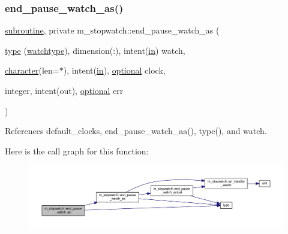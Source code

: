 \subsubsection{\texorpdfstring{end\+\_\+pause\+\_\+watch\+\_\+as()}{end\_pause\_watch\_as()}}
{\footnotesize\ttfamily \hyperlink{M__stopwatch_83_8txt_acfbcff50169d691ff02d4a123ed70482}{subroutine}, private m\+\_\+stopwatch\+::end\+\_\+pause\+\_\+watch\+\_\+as (\begin{DoxyParamCaption}\item[{\hyperlink{stop__watch_83_8txt_a70f0ead91c32e25323c03265aa302c1c}{type} (\hyperlink{structm__stopwatch_1_1watchtype}{watchtype}), dimension(\+:), intent(\hyperlink{M__journal_83_8txt_afce72651d1eed785a2132bee863b2f38}{in})}]{watch,  }\item[{\hyperlink{option__stopwatch_83_8txt_abd4b21fbbd175834027b5224bfe97e66}{character}(len=$\ast$), intent(\hyperlink{M__journal_83_8txt_afce72651d1eed785a2132bee863b2f38}{in}), \hyperlink{option__stopwatch_83_8txt_aa4ece75e7acf58a4843f70fe18c3ade5}{optional}}]{clock,  }\item[{integer, intent(out), \hyperlink{option__stopwatch_83_8txt_aa4ece75e7acf58a4843f70fe18c3ade5}{optional}}]{err }\end{DoxyParamCaption})\hspace{0.3cm}{\ttfamily [private]}}



References default\+\_\+clocks, end\+\_\+pause\+\_\+watch\+\_\+aa(), type(), and watch.

Here is the call graph for this function\+:
\nopagebreak
\begin{figure}[H]
\begin{center}
\leavevmode
\includegraphics[width=350pt]{namespacem__stopwatch_abf357521b2751b550b6097542dadf213_cgraph}
\end{center}
\end{figure}
\mbox{\label{namespacem__stopwatch_a9b7a584834f64f147b50fafd7574ef61}} 
